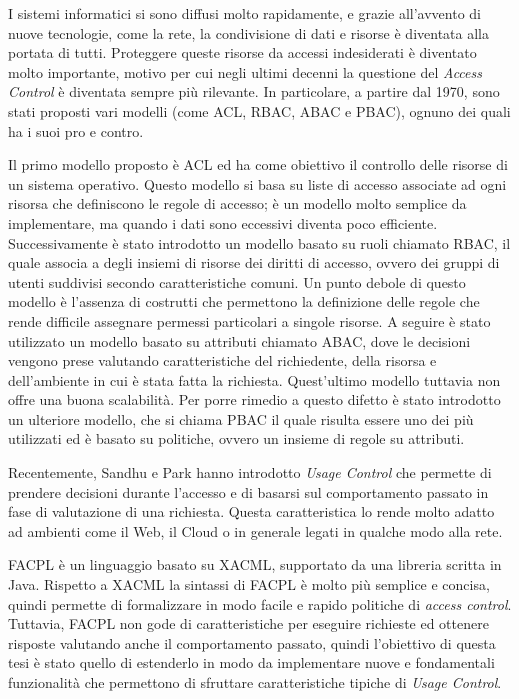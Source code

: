 

I sistemi informatici si sono diffusi molto rapidamente, e grazie all'avvento di nuove tecnologie, come la rete, la condivisione di dati e risorse è diventata alla portata di tutti. Proteggere queste risorse da accessi 
indesiderati è diventato molto importante, motivo per cui negli ultimi decenni la questione 
del \textit{Access Control} è diventata sempre più rilevante.
In particolare,
a partire dal 1970, sono stati proposti vari modelli (come \ac{ACL},
\ac{RBAC}, \ac{ABAC} e \ac{PBAC}), ognuno dei quali ha i suoi pro e contro.


Il primo modello proposto è \ac{ACL} ed ha come obiettivo il controllo delle risorse di un sistema operativo. Questo modello si basa su liste di accesso associate
ad ogni risorsa che definiscono le regole di accesso; è un modello molto
semplice da implementare, ma quando i dati sono eccessivi diventa
poco efficiente. 
Successivamente è stato introdotto un modello basato su
ruoli chiamato \ac{RBAC}, il quale associa a degli insiemi di risorse dei diritti di accesso, ovvero dei gruppi
di utenti suddivisi secondo caratteristiche comuni. Un punto debole
di questo modello è l'assenza di costrutti che permettono la definizione
delle regole che rende difficile assegnare permessi particolari a singole
risorse. A seguire è stato utilizzato un modello basato su attributi chiamato \ac{ABAC}, dove
le decisioni vengono prese valutando caratteristiche del richiedente,
della risorsa e dell’ambiente in cui è stata fatta la richiesta. Quest’ultimo
modello tuttavia non offre una buona scalabilità. Per porre
rimedio a questo difetto è stato introdotto un ulteriore modello, che si chiama \ac{PBAC}
il quale risulta essere uno dei più utilizzati ed è basato su politiche, 
ovvero un insieme di regole su attributi. 

Recentemente, Sandhu e Park \cite{ucon}
hanno introdotto \textit{Usage Control}
che permette di prendere decisioni durante
l’accesso e di basarsi sul comportamento passato in fase di valutazione
di una richiesta. Questa caratteristica lo rende molto adatto ad ambienti come il Web,
il Cloud o in generale legati in qualche modo alla rete. \par

\ac{FACPL} è un linguaggio basato su \ac{XACML}, supportato da una libreria
scritta in Java. Rispetto a \ac{XACML} la sintassi di \ac{FACPL} è molto più semplice
e concisa, quindi permette di formalizzare in modo facile e rapido
politiche di \textit{access control}. Tuttavia, \ac{FACPL} non gode di caratteristiche
per eseguire richieste ed ottenere risposte valutando
anche il comportamento passato, quindi l’obiettivo di questa tesi è stato
quello di estenderlo in modo da implementare nuove e fondamentali funzionalità
che permettono di sfruttare caratteristiche tipiche di \textit{Usage Control}.  \par

